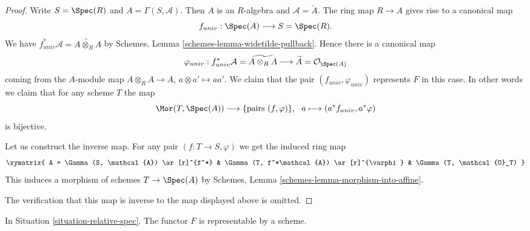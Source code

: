 \begin{proof}
Write $S = \Spec(R)$ and $A = \Gamma(S, \mathcal{A})$.
Then $A$ is an $R$-algebra and $\mathcal{A} = \widetilde A$.
The ring map $R \to A$ gives rise to a canonical map
$$
f_{univ} : \Spec(A)
\longrightarrow
S = \Spec(R).
$$
We have
$f_{univ}^*\mathcal{A} =  \widetilde{A \otimes_R A}$
by Schemes, Lemma \ref{schemes-lemma-widetilde-pullback}.
Hence there is a canonical map
$$
\varphi_{univ} :
f_{univ}^*\mathcal{A} = \widetilde{A \otimes_R A}
\longrightarrow
\widetilde A = \mathcal{O}_{\Spec(A)}
$$
coming from the $A$-module map $A \otimes_R A \to A$,
$a \otimes a' \mapsto aa'$. We claim that the pair
$(f_{univ}, \varphi_{univ})$ represents $F$ in this case.
In other words we claim that for any scheme $T$ the map
$$
\Mor(T, \Spec(A)) \longrightarrow
\{\text{pairs } (f, \varphi)\}, \ \
a \longmapsto (a^*f_{univ}, a^*\varphi)
$$
is bijective.

\medskip\noindent
Let us construct the inverse map.
For any pair $(f : T \to S, \varphi)$ we get the induced
ring map
$$
\xymatrix{
A = \Gamma(S, \mathcal{A}) \ar[r]^{f^*} &
\Gamma(T, f^*\mathcal{A}) \ar[r]^{\varphi} &
\Gamma(T, \mathcal{O}_T)
}
$$
This induces a morphism of schemes $T \to \Spec(A)$
by Schemes, Lemma \ref{schemes-lemma-morphism-into-affine}.

\medskip\noindent
The verification that this map is inverse to the map
displayed above is omitted.
\end{proof}

\begin{lemma}
\label{lemma-spec}
In Situation \ref{situation-relative-spec}.
The functor $F$ is representable by a scheme.
\end{lemma}

